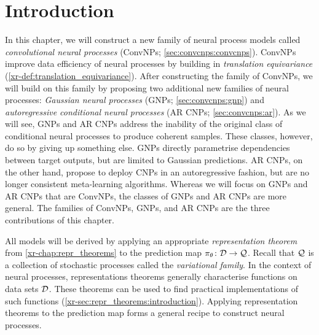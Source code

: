 \documentclass[12pt]{report}
\newcommand{\xrprefix}[1]{xr-#1}
\begin{document}
\section{Introduction}
\label{sec:convcnps:introduction}

In this chapter, we will construct a new family of neural process models called \emph{convolutional neural processes} (ConvNPs; \cref{sec:convcnps:convcnps}).
ConvNPs improve data efficiency of neural processes by building in \emph{translation equivariance} (\cref{\xrprefix{def:translation_equivariance}}).
%
After constructing the family of ConvNPs, we will build on this family 
by proposing two additional new families of neural processes:
\emph{Gaussian neural processes} (GNPs; \cref{sec:convcnps:gnp})
and \emph{autoregressive conditional neural processes} (AR CNPs; \cref{sec:convcnps:ar}).
As we will see,
GNPs and AR CNPs address the inability of the original class of conditional neural processes \parencite[CNPs;][]{Garnelo:2018:Conditional_Neural_Processes} to produce coherent samples.
These classes, however, do so by giving up something else.
GNPs
directly parametrise dependencies between target outputs,
but are limited to Gaussian predictions.
AR CNPs, on the other hand, propose to deploy CNPs in an autoregressive fashion, but are no longer consistent meta-learning algorithms.
Whereas we will focus on GNPs and AR CNPs that are ConvNPs, the classes of GNPs and AR CNPs are more general.
The families of ConvNPs, GNPs, and AR CNPs are the three contributions of this chapter.

%
%

All models will be derived by applying an appropriate \emph{representation theorem} from \cref{\xrprefix{chap:repr_theorems}} to the prediction map $\pi_\theta \colon \mathcal{D} \to \mathcal{Q}$.
Recall that $\mathcal{Q}$ is a collection of stochastic processes called the \emph{variational family}.
In the context of neural processes, representations theorems generally characterise functions on data sets $\mathcal{D}$.
These theorems can be used to find practical implementations of such functions (\cref{\xrprefix{sec:repr_theorems:introduction}}).
Applying representation theorems to the prediction map forms a general recipe to construct neural processes.
\end{document}
